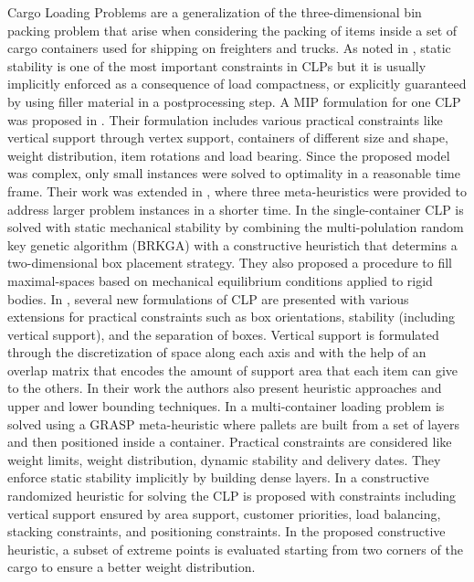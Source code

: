 Cargo Loading Problems are a generalization of the three-dimensional bin packing problem that arise when considering the packing of items inside a set of cargo containers used for shipping on freighters and trucks.
As noted in \cite{BORTFELDT20131}, static stability is one of the most important constraints in CLPs but it is usually implicitly enforced as a consequence of load compactness, or explicitly guaranteed by using filler material in a postprocessing step.
A MIP formulation for one CLP was proposed in \cite{paquay2016mixed}. Their formulation includes various practical constraints like vertical support through vertex support, containers of different size and shape, weight distribution, item rotations and load bearing.
Since the proposed model was complex, only small instances were solved to optimality in a reasonable time frame. Their work was extended in \cite{paquay2007}, where three meta-heuristics were provided to address larger problem instances in a shorter time.
In \cite{GALRAORAMOS2016565} the single-container CLP is solved with static mechanical stability by combining the multi-polulation random key genetic algorithm (BRKGA) with a constructive heuristich that determins a two-dimensional box placement strategy.
They also proposed a procedure to fill maximal-spaces based on mechanical equilibrium conditions applied to rigid bodies.
In \cite{kurpel2020exact}, several new formulations of CLP are presented with various extensions for practical constraints such as box orientations, stability (including vertical support), and the separation of boxes.
Vertical support is formulated through the discretization of space along each axis and with the help of an overlap matrix that encodes the amount of support area that each item can give to the others.
In their work the authors also present heuristic approaches and upper and lower bounding techniques.
In \cite{Alonso2020} a multi-container loading problem is solved using a GRASP meta-heuristic where pallets are built from a set of layers and then positioned inside a container. 
Practical constraints are considered like weight limits, weight distribution, dynamic stability and delivery dates. They enforce static stability implicitly by building dense layers.
In \cite{GAJDA2022102559} a constructive randomized heuristic for solving the CLP is proposed with constraints including vertical support ensured by area support, customer priorities, load balancing, stacking constraints, and positioning constraints.
In the proposed constructive heuristic, a subset of extreme points is evaluated starting from two corners of the cargo to ensure a better weight distribution.

